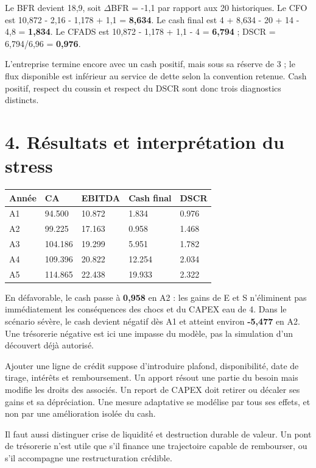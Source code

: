 \documentclass[12pt,a4paper]{article}
\begin{document}
Le BFR devient 18,9, soit $\Delta$BFR = -1,1 par rapport aux 20 historiques. Le CFO est 10,872 - 2,16 - 1,178 + 1,1 = \textbf{8,634}. Le cash final est 4 + 8,634 - 20 + 14 - 4,8 = \textbf{1,834}. Le CFADS est 10,872 - 1,178 + 1,1 - 4 = \textbf{6,794} ; DSCR = 6,794/6,96 = \textbf{0,976}.


L’entreprise termine encore avec un cash positif, mais sous sa réserve de 3 ; le flux disponible est inférieur au service de dette selon la convention retenue. Cash positif, respect du coussin et respect du DSCR sont donc trois diagnostics distincts.

\section*{4. Résultats et interprétation du stress}

\Needspace{250pt}
\begin{longtable}{p{2.84cm}p{2.84cm}p{2.84cm}p{2.84cm}p{2.84cm}}
\toprule
Année & CA & EBITDA & Cash final & DSCR \\
\midrule\endhead
A1 & 94.500 & 10.872 & 1.834 & 0.976 \\
A2 & 99.225 & 17.163 & 0.958 & 1.468 \\
A3 & 104.186 & 19.299 & 5.951 & 1.782 \\
A4 & 109.396 & 20.822 & 12.254 & 2.034 \\
A5 & 114.865 & 22.438 & 19.933 & 2.322 \\
\bottomrule
\end{longtable}

En défavorable, le cash passe à \textbf{0,958} en A2 : les gains de E et S n’éliminent pas immédiatement les conséquences des chocs et du CAPEX eau de 4. Dans le scénario sévère, le cash devient négatif dès A1 et atteint environ \textbf{-5,477} en A2. Une trésorerie négative est ici une impasse du modèle, pas la simulation d’un découvert déjà autorisé.


Ajouter une ligne de crédit suppose d’introduire plafond, disponibilité, date de tirage, intérêts et remboursement. Un apport résout une partie du besoin mais modifie les droits des associés. Un report de CAPEX doit retirer ou décaler ses gains et sa dépréciation. Une mesure adaptative se modélise par tous ses effets, et non par une amélioration isolée du cash.


Il faut aussi distinguer crise de liquidité et destruction durable de valeur. Un pont de trésorerie n’est utile que s’il finance une trajectoire capable de rembourser, ou s’il accompagne une restructuration crédible.
\end{document}
